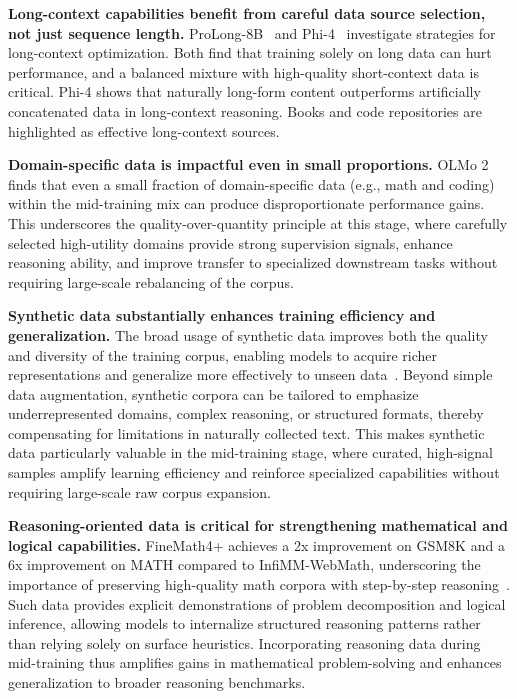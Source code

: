 \noindent\textbf{Long-context capabilities benefit from careful data source selection, not just sequence length.}
ProLong-8B~\cite{gao2024train} and Phi-4~\cite{abdin2024phi} investigate strategies for long-context optimization. Both find that training solely on long data can hurt performance, and a balanced mixture with high-quality short-context data is critical. Phi-4 shows that naturally long-form content outperforms artificially concatenated data in long-context reasoning. Books and code repositories are highlighted as effective long-context sources.


\noindent\textbf{Domain-specific data is impactful even in small proportions.}
OLMo 2~\cite{olmo20242} finds that even a small fraction of domain-specific data (e.g., math and coding) within the mid-training mix can produce disproportionate performance gains. This underscores the quality-over-quantity principle at this stage, where carefully selected high-utility domains provide strong supervision signals, enhance reasoning ability, and improve transfer to specialized downstream tasks without requiring large-scale rebalancing of the corpus.



\noindent\textbf{Synthetic data substantially enhances training efficiency and generalization.}
The broad usage of synthetic data improves both the quality and diversity of the training corpus, enabling models to acquire richer representations and generalize more effectively to unseen data~\cite{sun2024hunyuan}. Beyond simple data augmentation, synthetic corpora can be tailored to emphasize underrepresented domains, complex reasoning, or structured formats, thereby compensating for limitations in naturally collected text. This makes synthetic data particularly valuable in the mid-training stage, where curated, high-signal samples amplify learning efficiency and reinforce specialized capabilities without requiring large-scale raw corpus expansion.

\noindent\textbf{Reasoning-oriented data is critical for strengthening mathematical and logical capabilities.}
FineMath4+ achieves a 2x improvement on GSM8K and a 6x improvement on MATH compared to InfiMM-WebMath, underscoring the importance of preserving high-quality math corpora with step-by-step reasoning~\cite{allal2025smollm2}. Such data provides explicit demonstrations of problem decomposition and logical inference, allowing models to internalize structured reasoning patterns rather than relying solely on surface heuristics. Incorporating reasoning data during mid-training thus amplifies gains in mathematical problem-solving and enhances generalization to broader reasoning benchmarks.

